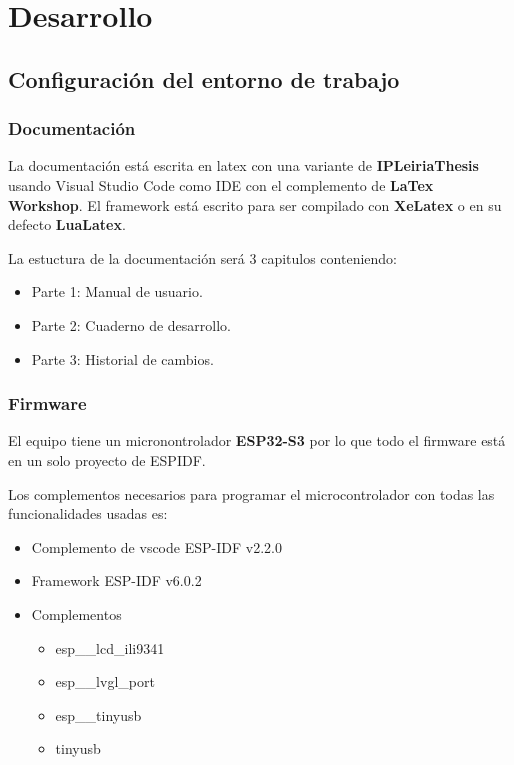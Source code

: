 \chapter[Desarrollo]{Desarrollo}

\section{Configuración del entorno de trabajo}
\subsection{Documentación}
La documentación está escrita en latex con una variante de \textbf{IPLeiriaThesis} usando Visual Studio Code como IDE con el complemento de \textbf{LaTex Workshop}. El framework está escrito para ser compilado con \textbf{XeLatex} o en su defecto \textbf{LuaLatex}.

La estuctura de la documentación será 3 capitulos conteniendo:
\begin{itemize}
    \item Parte 1: Manual de usuario.
    \item Parte 2: Cuaderno de desarrollo.
    \item Parte 3: Historial de cambios.
\end{itemize}

\subsection{Firmware}
El equipo tiene un micronontrolador \textbf{ESP32-S3} por lo que todo el firmware está en un solo proyecto de ESPIDF.

Los complementos necesarios para programar el microcontrolador con todas las funcionalidades usadas es:
\begin{itemize}
    \item Complemento de vscode ESP-IDF v2.2.0
    \item Framework ESP-IDF v6.0.2
    \item Complementos
    \begin{itemize}
        \item esp\_\_lcd\_ili9341
        \item esp\_\_lvgl\_port
        \item esp\_\_tinyusb
        \item tinyusb
    \end{itemize}
\end{itemize}

